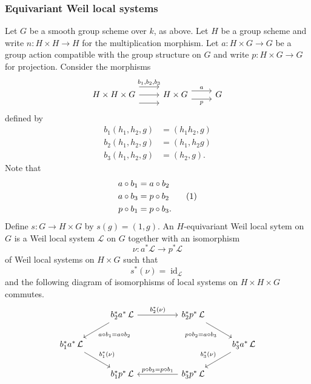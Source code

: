 \documentclass[10pt]{amsart}
\theoremstyle{plain}
\theoremstyle{definition}
\DeclareMathOperator{\id}{id}
\newcommand{\cs}[1]{{\mathcal{#1}}}
\newcommand\numberthis{\addtocounter{equation}{1}\tag{\theequation}}
\begin{document}
\subsubsection{Equivariant Weil local systems}\label{ssec:equivariant1}

Let $G$ be a smooth group scheme over $k$, as above.
Let $H$ be a group scheme and write $n : H \times H \to H$ for the multiplication morphism.
Let $a : H \times G\to G$ be a group action compatible with the group structure on $G$ and write $p : H\times G \to G$ for projection. 
Consider the morphisms
\[
\begin{tikzcd}
H \times H \times G 
\arrow[shift left=4]{r}{b_1, b_2, b_3} 
\arrow{r}{}
\arrow[shift right=4]{r}{} 
& H \times G 
\arrow[shift left=2]{r}{a}
\arrow[shift right=2]{r}[swap]{p}
 & G 
\end{tikzcd}
\]
defined by 
\begin{align*}
b_1(h_1,h_2,g) &= (h_1h_2,g) \\
b_2(h_1,h_2,g) &= (h_1,h_2g) \\
b_3(h_1,h_2,g) &= (h_2,g).
\end{align*}
Note that
\begin{align*}
a\circ b_1 &= a\circ b_2 \\
a\circ b_3 &= p\circ b_2 \numberthis \label{eqn:bap}\\
p\circ b_1 &= p\circ b_3.
\end{align*}
Define $s : G\to H\times G$ by $s(g) = (1,g)$.
An $H$-equivariant Weil local sytem on $G$ is a Weil local system $\cs{L}$ on $G$ together with an isomorphism  
\[
\nu : a^*\cs{L} \to p^*\cs{L}
\] 
of Weil local systems on $H\times G$ such that 
\begin{equation}\label{E1}
s^*(\nu) = \id_{\cs{L}}
\end{equation}
and the following diagram of isomorphisms of local systems on $H\times H\times G$ commutes.
\begin{equation}\label{E2}
\begin{tikzcd}
\ &  \arrow{dl}{a\circ b_1 = a\circ b_2}  b_2^*  a^*\, \mathcal{L} \arrow{rr}{b_2^*(\nu)} && b_2^* p^*\, \mathcal{L} \arrow{dr}[swap]{p\circ b_2 = a\circ b_3} & \\
b_1^* a^*\, \mathcal{L} \arrow{dr}{b_1^*(\nu)} &&&&   \arrow{dl}[swap]{b_3^*(\nu)} b_3^* a^*\, \mathcal{L} \\
& b_1^* p^*\, \mathcal{L}  && \arrow{ll}[swap]{p\circ b_3 = p\circ b_1} b_3^* p^*\, \mathcal{L} & 
\end{tikzcd}
\end{equation}
\end{document}

